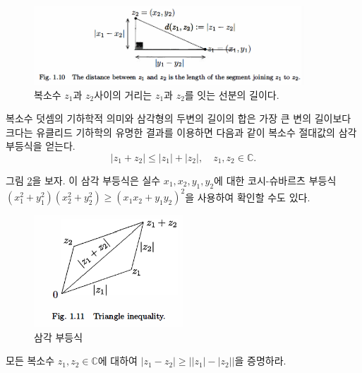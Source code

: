 \begin{figure}[!h]
\begin{center}
\includegraphics[width=0.9\textwidth]{./SaltChapter/fig-1-10}
\end{center}
\caption{복소수 $z_1$과 $z_2$사이의 거리는 $z_1$과 $z_2$를 잇는 선분의 길이다.}
\label{fig-1-10}
\end{figure}

복소수 덧셈의 기하학적 의미와 
삼각형의 두변의 길이의 합은 가장 큰 변의 길이보다 크다는 
유클리드 기하학의 유명한 결과를 이용하면
다음과 같이 복소수 절대값의 삼각 부등식을 얻는다.
$$
|z_1+z_2| \le |z_1|  + |z_2|, \quad z_1, z_2\in\mathbb C.
$$

그림 \ref{fig-1-11}을 보자.
이 삼각 부등식은 실수 $x_1, x_2, y_1, y_2$에 대한 코시-슈바르츠 부등식
$(x_1^2+y_1^2) (x_2^2+y_2^2) \ge (x_1x_2 + y_1y_2)^2$을 사용하여
확인할 수도 있다.


\begin{figure}[!h]
\begin{center}
\includegraphics[width=0.5\textwidth]{./SaltChapter/fig-1-11}
\end{center}
\caption{삼각 부등식}
\label{fig-1-11}
\end{figure}

\begin{salt_exercise} \label{ex-1-22}
모든 복소수 $z_1, z_2\in \mathbb C$에 대하여
$|z_1-z_2| \ge \left| |z_1| - |z_2| \right|$을 증명하라.
\end{salt_exercise}

